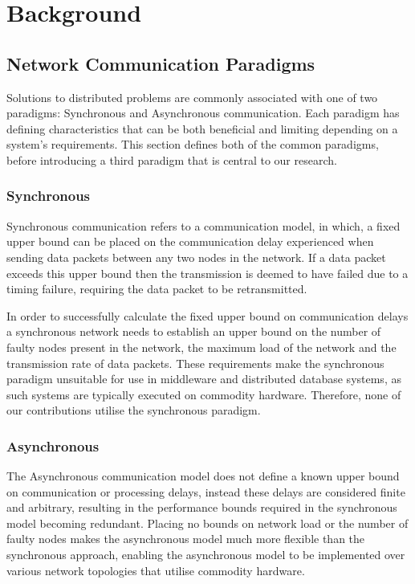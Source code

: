  \chapter{Background}

    \graphicspath{{Chapter2-Background/Figs/Vector/}{Chapter2-Background/Figs/}}

\section[Network Communication Paradigms]{Network Communication Paradigms}
Solutions to distributed problems are commonly associated with one of two paradigms: Synchronous and Asynchronous communication. Each paradigm has defining characteristics that can be both beneficial and limiting depending on a system's requirements.  This section defines both of the common paradigms, before introducing a third paradigm that is central to our research.  

	\subsection{Synchronous}
	Synchronous communication refers to a communication model, in which, a fixed upper bound can be placed on the communication delay experienced when sending data packets between any two nodes in the network. If a data packet exceeds this upper bound then the transmission is deemed to have failed due to a timing failure, requiring the data packet to be retransmitted. 
	
	In order to successfully calculate the fixed upper bound on communication delays a synchronous network needs to establish an upper bound on the number of faulty nodes present in the network, the maximum load of the network and the transmission rate of data packets\citep{Cristian:1996:SA:227210.227231}. These requirements make the synchronous paradigm unsuitable for use in middleware and distributed database systems, as such systems are typically executed on commodity hardware.  Therefore, none of our contributions utilise the synchronous paradigm.  
	 
	\subsection{Asynchronous}
	The Asynchronous communication model does not define a known upper bound on communication or processing delays, instead these delays are considered finite and arbitrary, resulting in the performance bounds required in the synchronous model becoming redundant\citep{Cristian:1996:SA:227210.227231}. Placing no bounds on network load or the number of faulty nodes makes the asynchronous model much more flexible than the synchronous approach, enabling the asynchronous model to be implemented over various network topologies that utilise commodity hardware. 

